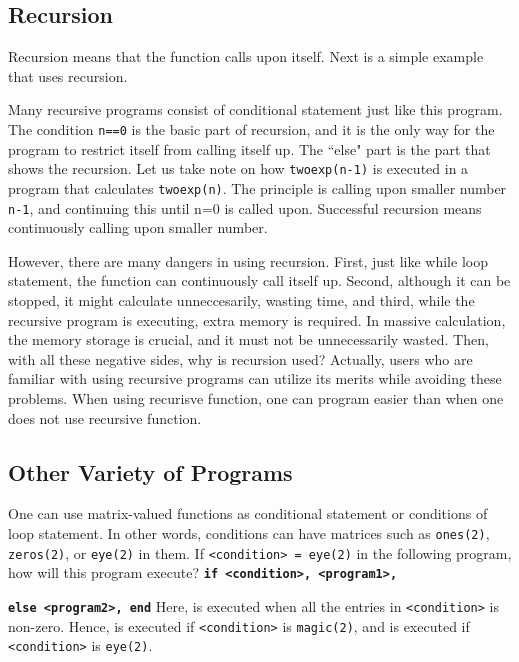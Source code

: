 \subsection{Recursion}
Recursion means that the function calls upon itself. Next is a simple example that uses recursion. \vv
\begin{center}
\end{center} \vn Many recursive programs consist of conditional statement just like this program. The condition {\tt n==0} is the basic part of recursion, and it is the only way for the program to restrict itself from calling itself up. The ``else" part is the part that shows the recursion. Let us take note on how {\tt twoexp(n-1)} is executed in a program that calculates {\tt twoexp(n)}. The principle is calling upon smaller number {\tt n-1}, and continuing this until n=0 is called upon. Successful recursion means continuously calling upon smaller number.

\vv However, there are many dangers in using recursion. First, just like while loop statement, the function can continuously call itself up. Second, although it can be stopped, it might calculate unneccesarily, wasting time, and third, while the recursive program is executing, extra memory is required. In massive calculation, the memory storage is crucial, and it must not be unnecessarily wasted. Then, with all these negative sides, why is recursion used? Actually, users who are familiar with using recursive programs can utilize its merits while avoiding these problems. When using recurisve function, one can program easier than when one does not use recursive function.

\subsection{Other Variety of Programs}
One can use matrix-valued functions as conditional statement or conditions of loop statement. In other words, conditions can have matrices such as {\tt ones(2)}, {\tt zeros(2)}, or {\tt eye(2)} in them. If {\tt <condition> = eye(2)} in the following program, how will this program execute?\vv
\texttt{\textbf{if <condition>, <program1>,}}
\par \texttt{\textbf{else <program2>, end}}
\vn Here, {\tt <program1>} is executed when all the entries in {\tt <condition>} is non-zero. Hence, {\tt <program1>} is executed if {\tt <condition>} is {\tt magic(2)}, and {\tt <program2>} is executed if {\tt <condition>} is {\tt eye(2)}.

